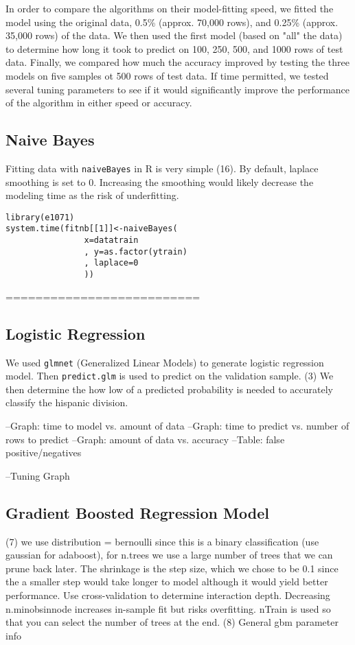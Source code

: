 \documentclass[a4paper]{article}
\begin{document}
\begin{multicols}{2}
In order to compare the algorithms on their model-fitting speed, we fitted the model using the original data, 0.5\% (approx. 70,000 rows), and 0.25\% (approx. 35,000 rows) of the data. We then used the first model (based on "all" the data) to determine how long it took to predict on 100, 250, 500, and 1000 rows of test data. Finally, we compared how much the accuracy improved by testing the three models on five samples ot 500 rows of test data. If time permitted, we tested several tuning parameters to see if it would significantly improve the performance of the algorithm in either speed or accuracy.


\subsection*{Naive Bayes}
Fitting data with \texttt{naiveBayes} in R is very simple (16). By default, laplace smoothing is set to 0. Increasing the smoothing would likely decrease the modeling time as the risk of underfitting.
\begin{verbatim}
library(e1071)
system.time(fitnb[[1]]<-naiveBayes(
                x=datatrain
                , y=as.factor(ytrain)
                , laplace=0
                ))
\end{verbatim}


==========================
\subsection*{Logistic Regression}
We used \texttt{glmnet} (Generalized Linear Models) to generate logistic regression model.
Then \texttt{predict.glm} is used to predict on the validation sample.
(3) We then determine the how low of a predicted probability is needed to accurately classify the hispanic division.

--Graph: time to model vs. amount of data
--Graph: time to predict vs. number of rows to predict
--Graph: amount of data vs. accuracy
--Table: false positive/negatives

--Tuning Graph

\subsection*{Gradient Boosted Regression Model}
(7) we use distribution = bernoulli since this is a binary classification (use gaussian for adaboost), for n.trees we use a large number of trees that we can prune back later. The shrinkage is the step size, which we chose to be 0.1 since the a smaller step would take longer to model although it would yield better performance. Use cross-validation to determine interaction depth. Decreasing n.minobsinnode increases in-sample fit but risks overfitting. nTrain is used so that you can select the number of trees at the end.
(8) General gbm parameter info


\end{multicols}
\end{document}
